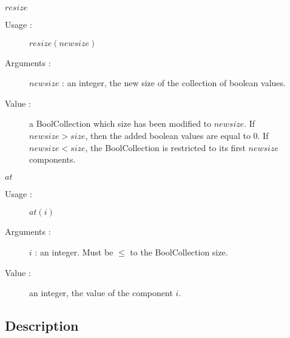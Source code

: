 \begin{description}
\item $resize$
  \begin{description}
  \item[Usage :] $resize(newsize)$
  \item[Arguments :]  $newsize$ : an integer, the new size of the  collection of boolean values.
  \item[Value :]  a BoolCollection which size has been modified to $newsize$. If $newsize > size$, then the added boolean values are equal to 0. If $newsize < size$, the BoolCollection is restricted to its first $newsize$ components.
  \end{description}
  \bigskip

\item $at$
  \begin{description}
  \item[Usage :] $at(i)$
  \item[Arguments :] $i$ : an integer. Must be $\leq$ to the BoolCollection size.
  \item[Value :] an integer, the value of the component $i$.
  \end{description}
  \bigskip

\end{description}




\newpage \subsection{Description}

